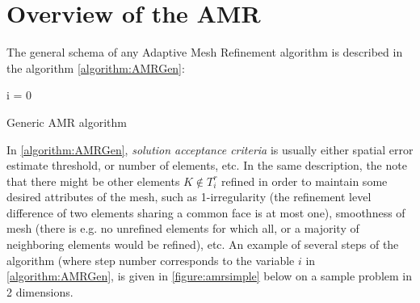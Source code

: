\section{Overview of the AMR}
The general schema of any Adaptive Mesh Refinement algorithm is described in the algorithm \cref{algorithm:AMRGen}:
\ \\
\begin{algorithm}[H]
 i = 0\\
 \caption{Generic AMR algorithm}
\label{algorithm:AMRGen}
\end{algorithm}
In \cref{algorithm:AMRGen}, \textit{solution acceptance criteria} is usually either spatial error estimate threshold, or number of elements, etc. In the same description, the note that there might be other elements $K \notin T^{r}_i$ refined in order to maintain some desired attributes of the mesh, such as 1-irregularity (the refinement level difference of two elements sharing a common face is at most one), smoothness of mesh (there is e.g. no unrefined elements for which all, or a majority of neighboring elements would be refined), etc.
An example of several steps of the algorithm (where step number corresponds to the variable $i$ in \cref{algorithm:AMRGen}, is given in \cref{figure:amrsimple} below on a sample problem in 2 dimensions.

